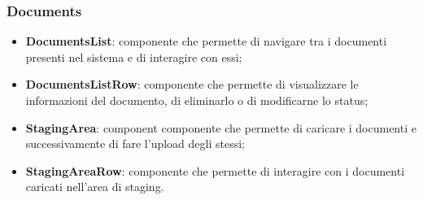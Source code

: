\documentclass[10pt, a4paper]{article}
\begin{document}
\subsubsection{Documents}
\begin{itemize}
    \item \label{DocumentsList}\textbf{DocumentsList}: componente che permette di navigare tra i documenti presenti nel sistema e di interagire con essi; 
    \item \label{DocumentsListRow}\textbf{DocumentsListRow}: componente che permette di visualizzare le informazioni del documento, di eliminarlo o di modificarne lo status;
    \item \label{StagingArea}\textbf{StagingArea}: component componente che permette di caricare i documenti e successivamente di fare l'upload degli stessi;
    \item \label{StagingAreaRow}\textbf{StagingAreaRow}: componente che permette di interagire con i documenti caricati nell'area di staging.
    
\end{itemize}
\end{document}
